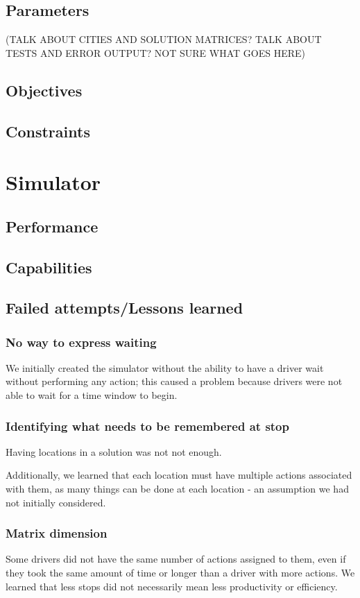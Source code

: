 \documentclass{article}
\begin{document}
\subsection{Parameters}
(TALK ABOUT CITIES AND SOLUTION MATRICES?  TALK ABOUT TESTS AND ERROR OUTPUT? NOT SURE WHAT GOES HERE)
\subsection{Objectives}

\subsection{Constraints}
\section{Simulator}
\subsection{Performance}
\subsection{Capabilities}
\subsection{Failed attempts/Lessons learned}


\subsubsection{No way to express waiting}
We initially created the simulator without the ability to have a driver wait without performing any action; this caused a problem because drivers were not able to wait for a time window to begin.  



\subsubsection{Identifying what needs to be remembered at stop}
Having locations in a solution was not not enough.

Additionally, we learned that each location must have multiple actions associated with them, as many things can be done at each location - an assumption we had not initially considered.


\subsubsection{Matrix dimension}
Some drivers did not have the same number of actions assigned to them, even if they took the same amount of time or longer than a driver with more actions.  We learned that less stops did not necessarily mean less productivity or efficiency.
\end{document}
